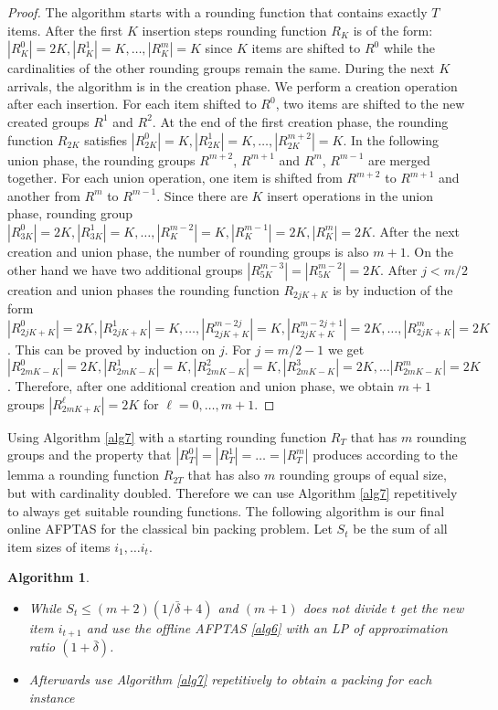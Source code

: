 \documentclass[a4paper,11pt]{article}
\newtheorem{algo}{Algorithm}
\begin{document}
\begin{proof}
	The algorithm starts with a rounding function that contains exactly $T$ items. After the first $K$ insertion steps
	rounding function $R_K$ is of the form:
	$|R_{K}^0|=2K, |R_{K}^1|=K, \ldots , |R_{K}^m|=K$ since $K$ items are shifted to $R^0$  while the cardinalities 
	of the other rounding groups remain the same.
	During the next $K$ arrivals, the algorithm is in the creation phase. We perform a creation operation after
	each insertion. For each item shifted to $R^0$, two items are shifted to the new created groups $R^1$ and $R^2$.
	At the end of the first creation
	phase, the rounding function $R_{2K}$ satisfies $|R_{2K}^0|=K, |R_{2K}^1|=K, \ldots , |R_{2K}^{m+2}|=K$.
	In the following union phase, the rounding groups $R^{m+2} $, $R^{m+1} $ and $R^{m}$, $R^{m-1}$
	are merged together. For each union operation, one item is shifted from $R^{m+2} $ to $R^{m+1}$
	and another from $R^{m} $ to $R^{m-1} $. Since there are $K$ insert operations in the union phase,
	rounding group $|R_{3K}^0|=2K, |R_{3K}^1|=K, \ldots , |R_{K}^{m-2}|=K, 
	|R_{K}^{m-1}|=2K, |R_{K}^{m}|=2K$. 
	After the next creation and union phase, the number of rounding groups is also $m+1$.
	On the other hand we have two additional groups $|R_{5K}^{m-3}| = |R_{5K}^{m-2}|	= 2K$.
	After $j<m/2$ creation and union phases the rounding
	function $R_{2jK+K}$ is by induction of the form $|R_{2jK+K}^0|=2K, |R_{2jK+K}^1|=K, \ldots , |R_{2jK+K}^{m-2j}|=K, 
	|R_{2jK+K}^{m-2j+1}|=2K, \ldots, |R_{2jK+K}^{m}|=2K$. 
	This can be proved by induction on $j$. For $j = m/2 -1$ we get $|R_{2mK-K}^0|=2K, |R_{2mK-K}^1|=K, 
	|R_{2mK-K}^2| = K, |R_{2mK-K}^3| = 2K, \ldots |R_{2mK-K}^m| = 2K$.
	Therefore, after one additional creation and union phase, we obtain $m+1$ groups $|R_{2mK+K}^{\ell}|=2K$ for
	$\ell = 0, \ldots , m+1$.
\end{proof}
Using Algorithm \ref{alg7} with a starting rounding function $R_T$ that has $m$ rounding groups and the property that 
$|R_{T}^0|= |R_{T}^1|= \ldots = |R_{T}^m|$
produces according to the lemma a rounding function $R_{2T}$ that has also $m$ rounding groups of equal size,
but with cardinality doubled.
Therefore we can use Algorithm \ref{alg7} repetitively to always get suitable rounding functions.
The following algorithm is our final online AFPTAS for the classical bin packing problem. Let $S_t$ be the sum
of all item sizes of items $i_1, \ldots i_t$.
\begin{algo}\label{alg8}
\
\begin{itemize}
\item While $S_t \leq (m+2)(1/ \bar{\delta} +4)$ and $(m+1)$ does not divide $t$ get the new item $i_{t+1}$ and
use the offline AFPTAS \ref{alg6} with an LP of approximation ratio $(1+\bar{\delta})$.
\item Afterwards use Algorithm \ref{alg7} repetitively to obtain a packing for each instance
\end{itemize}
\
\end{algo}
\end{document}
